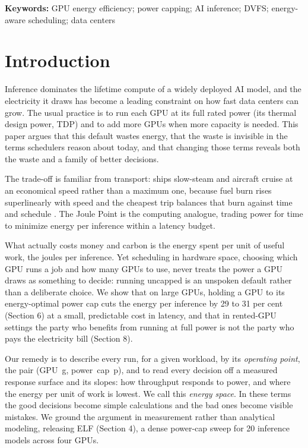 \textbf{Keywords:} GPU energy efficiency; power capping; AI inference; DVFS; energy-aware scheduling; data centers

\section{Introduction}\label{introduction}

Inference dominates the lifetime compute of a widely deployed AI model, and the electricity it
draws has become a leading constraint on how fast data centers can grow. The usual practice is to run each GPU
at its full rated power (its thermal design power, TDP) and to add more GPUs when more capacity is needed. This
paper argues that this default wastes energy, that the waste is invisible in the terms schedulers reason about
today, and that changing those terms reveals both the waste and a family of better decisions.

The trade-off is familiar from transport: ships slow-steam and aircraft cruise at an economical speed rather
than a maximum one, because fuel burn rises superlinearly with speed and the cheapest trip balances that burn
against time and schedule \cite{ref59, ref60}. The Joule Point is the computing analogue, trading power for time to
minimize energy per inference within a latency budget.

What actually costs money and carbon is the energy spent per unit of useful work, the joules per inference.
Yet scheduling in hardware space, choosing which GPU runs a job and how many GPUs to use, never treats the
power a GPU draws as something to decide: running uncapped is an unspoken default rather than a deliberate
choice. We show that on large GPUs, holding a GPU to its energy-optimal power cap cuts the energy per inference
by 29 to 31 per cent (Section 6) at a small, predictable cost in latency, and that
in rented-GPU settings the party who benefits from running at full power is not the party who pays the electricity bill (Section 8).

Our remedy is to describe every run, for a given workload, by its \emph{operating point}, the pair (GPU~g, power~cap~p),
and to read every decision off a measured response surface and its slopes: how
throughput responds to power, and where the energy per unit of work is lowest. We call this \emph{energy
space}. In these terms the good decisions become simple calculations and the bad ones become visible
mistakes. We ground the argument in measurement rather than analytical modeling, releasing ELF (Section 4), a
dense power-cap sweep for 20 inference models across four GPUs.

